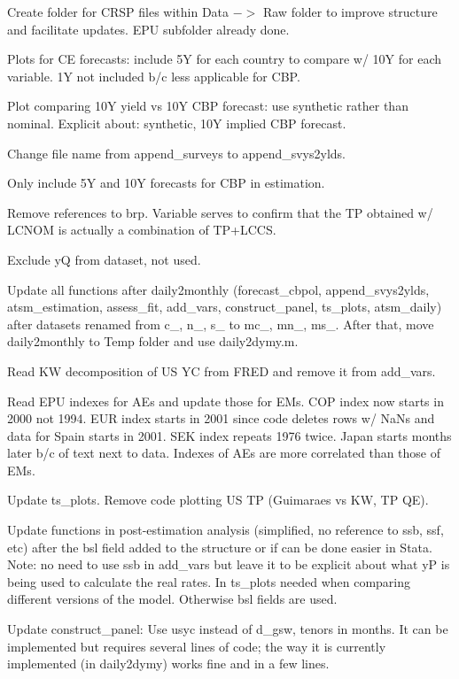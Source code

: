 \documentclass[12pt]{article}
\newcommand{\cmark}{\ding{51}}
\newcommand{\xmark}{\ding{55}}
\newcommand{\done}{\rlap{$\square$}{\raisebox{2pt}{\large\hspace{1pt}\cmark}}%
	\hspace{-2.5pt}}
\newcommand{\wontdo}{\rlap{$\square$}{\large\hspace{1pt}\xmark}}
\begin{document}
\begin{todolist}
	\begin{todolist}
		\item[\done] Create folder for CRSP files within Data \(->\) Raw folder to improve structure and facilitate updates. EPU subfolder already done.
		\item[\done] Plots for CE forecasts: include 5Y for each country to compare w/ 10Y for each variable. 1Y not included b/c less applicable for CBP.
		\item[\done] Plot comparing 10Y yield vs 10Y CBP forecast: use synthetic rather than nominal. Explicit about: synthetic, 10Y implied CBP forecast. 
		\item[\done] Change file name from append_surveys to append_svys2ylds.
		\item[\done] Only include 5Y and 10Y forecasts for CBP in estimation.
		\item[\wontdo] Remove references to brp. Variable serves to confirm that the TP obtained w/ LCNOM is actually a combination of TP+LCCS.
		\item[\done] Exclude yQ from dataset, not used.
		\item[\done] Update all functions after daily2monthly (forecast_cbpol, append_svys2ylds, atsm_estimation, assess_fit, add_vars, construct_panel, ts_plots, atsm_daily) after datasets renamed from c_, n_, s_ to mc_, mn_, ms_. After that, move daily2monthly to Temp folder and use daily2dymy.m.
		\item[\done] Read KW decomposition of US YC from FRED and remove it from add_vars.
		\item[\done] Read EPU indexes for AEs and update those for EMs. COP index now starts in 2000 not 1994. EUR index starts in 2001 since code deletes rows w/ NaNs and data for Spain starts in 2001. SEK index repeats 1976 twice. Japan starts months later b/c of text next to data. Indexes of AEs are more correlated than those of EMs.
		\item[\done] Update ts_plots. Remove code plotting US TP (Guimaraes vs KW, TP QE).
		\item[\done] Update functions in post-estimation analysis (simplified, no reference to ssb, ssf, etc) after the bsl field added to the structure or if can be done easier in Stata. Note: no need to use ssb in add_vars but leave it to be explicit about what yP is being used to calculate the real rates. In ts_plots needed when comparing different versions of the model. Otherwise bsl fields are used.
		\item[\wontdo] Update construct_panel: Use usyc instead of d_gsw, tenors in months. It can be implemented but requires several lines of code; the way it is currently implemented (in daily2dymy) works fine and in a few lines.

\end{todolist}
\end{todolist}
\end{document}
